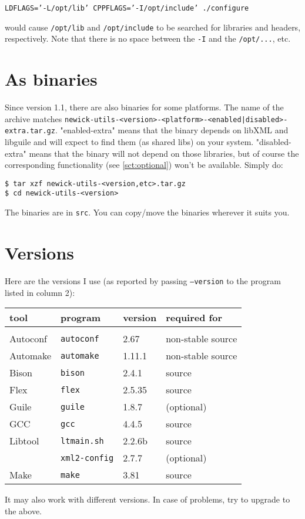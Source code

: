 \texttt{LDFLAGS='-L/opt/lib' CPPFLAGS='-I/opt/include' ./configure}

would cause \texttt{/opt/lib} and \texttt{/opt/include} to be searched for
libraries and headers, respectively. Note that there is no space between the
\texttt{-I} and the \texttt{/opt/...}, etc.

\section{As binaries}

Since version 1.1, there are also binaries for some platforms. The name of the
archive matches
\texttt{newick-utils-<version>-<platform>-<enabled|disabled>-extra.tar.gz}.
"enabled-extra" means that the binary depends on libXML and libguile and will
expect to find them (as shared libs) on your system. "disabled-extra" means that
the binary will not depend on those libraries, but of course the corresponding
functionality (see \ref{sct:optional}) won't be available. Simply do:

\begin{verbatim}
$ tar xzf newick-utils-<version,etc>.tar.gz
$ cd newick-utils-<version>
\end{verbatim}

\noindent{}The binaries are in \texttt{src}. You can copy/move the binaries
wherever it suits you.

\section{Versions}
\label{sct:versions}

\noindent{}Here are the versions I use (as reported by passing
\texttt{--version} to the program listed in column 2):

\begin{tabular}{llll}
\textbf{tool}	& \textbf{program} & \textbf{version} & \textbf{required for} \\
\hline \\
\gnu{} Autoconf	& \texttt{autoconf}	  	& 2.67 		& non-stable source \\
\gnu{} Automake	& \texttt{automake} 	 	& 1.11.1	& non-stable source \\
\gnu{} Bison 		& \texttt{bison}  			& 2.4.1 	& source \\ 
Flex						& \texttt{flex} 				& 2.5.35 	& source \\
\gnu{} Guile		& \texttt{guile}				& 1.8.7 	& (optional) \\
GCC 						& \texttt{gcc}  				& 4.4.5 	& source \\
\gnu{} Libtool	& \texttt{ltmain.sh}  	& 2.2.6b 	& source \\
\libxml{}				& \texttt{xml2-config}	& 2.7.7 	& (optional) \\ 
\gnu{} Make			& \texttt{make}			 		& 3.81		& source \\
\end{tabular}

\medskip{}
\noindent{}It may also work with different versions. In case of problems, try to
upgrade to the above.
